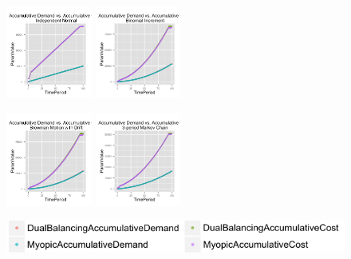 \documentclass{beamer}
\begin{document}
\begin{frame}
  \begin{figure}[ht]
  \begin{minipage}[b]{.45\linewidth}
  \includegraphics[height=1.2in]{figures/AccumulativeDemandAndCost_Normal.png}
  \end{minipage}
  \quad
  \begin{minipage}[b]{.45\linewidth}
  \includegraphics[height=1.2in]{figures/AccumulativeDemandAndCost_Binomial.png}
  \end{minipage}
  \end{figure}
  \begin{figure}[ht]
  \begin{minipage}[b]{.45\linewidth}
  \includegraphics[height=1.2in]{figures/AccumulativeDemandAndCost_Brownian.png}
  \end{minipage}
  \quad
  \begin{minipage}[b]{.45\linewidth}
  \includegraphics[height=1.2in]{figures/AccumulativeDemandAndCost_Markov.png}
  \end{minipage}
  \end{figure}
  \begin{figure}[ht]
  \begin{minipage}[b]{.9\linewidth}
  \includegraphics[height=.35in]{figures/key.png}
  \end{minipage}
  \end{figure}
\end{frame}
\end{document}
